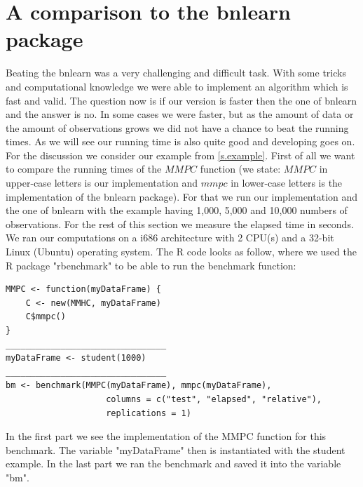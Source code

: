 \chapter{A comparison to the bnlearn package}

	Beating the bnlearn was a very challenging and difficult task. With some tricks and computational knowledge we were able to implement an algorithm which is fast and valid. The question now is if our version is faster then the one of bnlearn and the answer is no. In some cases we were faster, but as the amount of data or the amount of observations grows we did not have a chance to beat the running times. As we will see our running time is also quite good and developing goes on. For the discussion we consider our example from \autoref{s.example}. First of all we want to compare the running times of the $MMPC$ function (we state: $MMPC$ in upper-case letters is our implementation and $mmpc$ in lower-case letters is the implementation of the bnlearn package). For that we run our implementation and the one of bnlearn with the example having 1,000, 5,000 and 10,000 numbers of observations. For the rest of this section we measure the elapsed time in seconds. We ran our computations on a i686 architecture with 2 CPU(s) and a 32-bit Linux (Ubuntu) operating system. The R code looks as follow, where we used the R package "rbenchmark" to be able to run the benchmark function:

	\begin{program}
		\begin{snugshade}
  			\begin{verbatim}
MMPC <- function(myDataFrame) {
    C <- new(MMHC, myDataFrame)
    C$mmpc()
}
________________________________
myDataFrame <- student(1000)
________________________________
bm <- benchmark(MMPC(myDataFrame), mmpc(myDataFrame),
                    columns = c("test", "elapsed", "relative"),
                    replications = 1)
			\end{verbatim}
 		\end{snugshade}
		\caption{In the first part we see the implementation of the MMPC function for this benchmark. The variable "myDataFrame" then is instantiated with the student example. In the last part we ran the benchmark and saved it into the variable "bm".}
 	\end{program}

